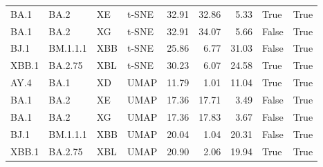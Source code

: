 \begin{tabular}{llllrrrll}
      BA.1 &       BA.2 &            XE &  t-SNE &         32.91 &         32.86 &          5.33 &                             True &                           True \\
      BA.1 &       BA.2 &            XG &  t-SNE &         32.91 &         34.07 &          5.66 &                            False &                           True \\
      BJ.1 &   BM.1.1.1 &           XBB &  t-SNE &         25.86 &          6.77 &         31.03 &                            False &                           True \\
     XBB.1 &    BA.2.75 &           XBL &  t-SNE &         30.23 &          6.07 &         24.58 &                             True &                           True \\
      AY.4 &       BA.1 &            XD &   UMAP &         11.79 &          1.01 &         11.04 &                             True &                           True \\
      BA.1 &       BA.2 &            XE &   UMAP &         17.36 &         17.71 &          3.49 &                            False &                           True \\
      BA.1 &       BA.2 &            XG &   UMAP &         17.36 &         17.83 &          3.67 &                            False &                           True \\
      BJ.1 &   BM.1.1.1 &           XBB &   UMAP &         20.04 &          1.04 &         20.31 &                            False &                           True \\
     XBB.1 &    BA.2.75 &           XBL &   UMAP &         20.90 &          2.06 &         19.94 &                             True &                           True \\
\bottomrule
\end{tabular}
